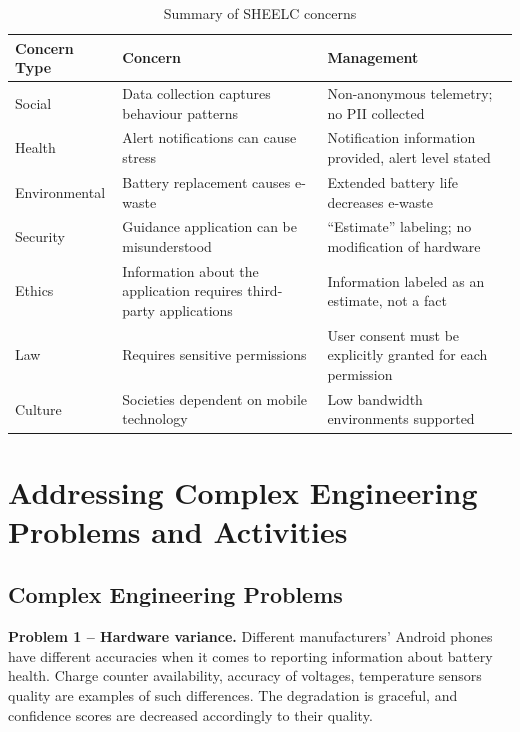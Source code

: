 \documentclass[12pt,a4paper]{report}
\begin{document}
\begin{table}[H]
\caption{Summary of SHEELC concerns}
\centering
\small
\begin{tabular}{l|p{2.8cm}|p{3.2cm}}
\toprule
\textbf{Concern Type} & \textbf{Concern} & \textbf{Management}\\
\midrule
Social      & Data collection captures behaviour patterns & Non-anonymous telemetry; no PII collected\\
Health      & Alert notifications can cause stress        & Notification information provided, alert level stated\\
Environmental & Battery replacement causes e-waste      & Extended battery life decreases e-waste\\
Security    & Guidance application can be misunderstood & ``Estimate'' labeling; no modification of hardware\\
Ethics      & Information about the application requires third-party applications & Information labeled as an estimate, not a fact\\
Law         & Requires sensitive permissions            & User consent must be explicitly granted for each permission\\
Culture     & Societies dependent on mobile technology   & Low bandwidth environments supported\\
\bottomrule
\end{tabular}
\end{table}

\chapter{Addressing Complex Engineering Problems and Activities}

\section{Complex Engineering Problems}

\textbf{Problem 1 – Hardware variance.}
Different manufacturers' Android phones have different accuracies when it comes to reporting information about battery health. Charge counter availability, accuracy of voltages, temperature sensors quality are examples of such differences. The degradation is graceful, and confidence scores are decreased accordingly to their quality.
\end{document}

